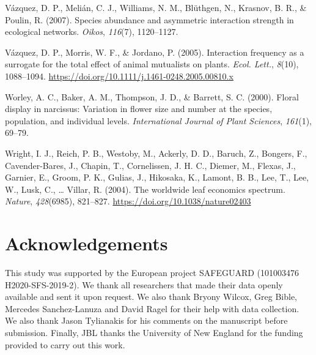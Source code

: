 \documentclass[
  12pt,
  a4paper,
]{article}
\newlength{\cslhangindent}
\newlength{\cslentryspacingunit} %
\newenvironment{CSLReferences}[2] %
 {%
  \setlength{\parindent}{0pt}
  \ifodd #1
  \let\oldpar\par
  \def\par{\hangindent=\cslhangindent\oldpar}
  \fi
  \setlength{\parskip}{#2\cslentryspacingunit}
 }%
 {}
\begin{document}
\begin{CSLReferences}{1}{0}
\leavevmode{}%
Vázquez, D. P., Melián, C. J., Williams, N. M., Blüthgen, N., Krasnov, B. R., \& Poulin, R. (2007). Species abundance and asymmetric interaction strength in ecological networks. \emph{Oikos}, \emph{116}(7), 1120--1127.

\leavevmode{}%
Vázquez, D. P., Morris, W. F., \& Jordano, P. (2005). Interaction frequency as a surrogate for the total effect of animal mutualists on plants. \emph{Ecol. Lett.}, \emph{8}(10), 1088--1094. \url{https://doi.org/10.1111/j.1461-0248.2005.00810.x}

\leavevmode{}%
Worley, A. C., Baker, A. M., Thompson, J. D., \& Barrett, S. C. (2000). Floral display in narcissus: Variation in flower size and number at the species, population, and individual levels. \emph{International Journal of Plant Sciences}, \emph{161}(1), 69--79.

\leavevmode{}%
Wright, I. J., Reich, P. B., Westoby, M., Ackerly, D. D., Baruch, Z., Bongers, F., Cavender-Bares, J., Chapin, T., Cornelissen, J. H. C., Diemer, M., Flexas, J., Garnier, E., Groom, P. K., Gulias, J., Hikosaka, K., Lamont, B. B., Lee, T., Lee, W., Lusk, C., \ldots{} Villar, R. (2004). The worldwide leaf economics spectrum. \emph{Nature}, \emph{428}(6985), 821--827. \url{https://doi.org/10.1038/nature02403}

\end{CSLReferences}

\hypertarget{acknowledgements}{%
\section{Acknowledgements}\label{acknowledgements}}

This study was supported by the European project SAFEGUARD (101003476 H2020-SFS-2019-2). We thank all researchers that made their data openly available and sent it upon request. We also thank Bryony Wilcox, Greg Bible, Mercedes Sanchez-Lanuza and David Ragel for their help with data collection. We also thank Jason Tylianakis for his comments on the manuscript before submission. Finally, JBL thanks the University of New England for the funding provided to carry out this work.

\singlespacing
\end{document}
